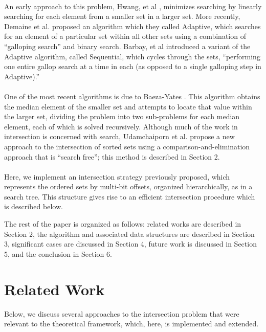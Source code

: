\documentclass[11pt,letterpaper]{article}
\begin{document}
\paragraph{}
An early approach to this problem, Hwang, et al \cite{hwang:10},
minimizes searching by linearly searching for each element from a smaller set
in a larger set. More recently, Demaine et al. \cite{338634} proposed an algorithm
which they called Adaptive, which searches for an element of a particular set 
within all other sets using a combination of ``galloping search'' and binary search.
Barbay, et al \cite{1564507} introduced a variant of the Adaptive algorithm,
called Sequential, which cycles through the sets, ``performing one entire
gallop search at a time in each (as opposed to a single galloping step
in Adaptive).''

\paragraph{}
One of the most recent algorithms is due to Baeza-Yates \cite{BY:03}.
This algorithm obtains the median element of the smaller set and attempts
to locate that value within the larger set, dividing the problem into
two sub-problems for each median element, each of which is solved recursively.
Although much of the work in intersection is concerned with search,
Udamchaiporn et al. propose a new approach to the intersection of sorted sets
using a comparison-and-elimination approach that is ``search free''; this method
is described in Section 2.

\paragraph{}
Here, we implement an intersection strategy previously proposed,
which represents the ordered sets by multi-bit offsets, organized hierarchically,
as in a search tree.  This structure gives rise to an efficient intersection procedure
which is described below.

The rest of the paper is organized as follows: related works
are described in Section 2, the algorithm and associated data structures are
described in Section 3, significant cases are discussed in Section 4, future work is
discussed in Section 5, and the conclusion in Section 6.



\section{Related Work}
Below, we discuss several approaches to the intersection problem that
were relevant to the theoretical framework, which, here, is implemented
and extended.
\end{document}
